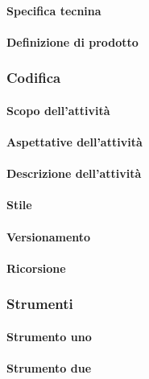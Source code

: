  \paragraph{Specifica tecnina}

 \paragraph{Definizione di prodotto}

\subsubsection{Codifica}
 \paragraph{Scopo dell'attività}

 \paragraph{Aspettative dell'attività}

 \paragraph{Descrizione dell'attività}

 \paragraph{Stile}

 \paragraph{Versionamento}

 \paragraph{Ricorsione}

\subsubsection{Strumenti}
  \paragraph{Strumento uno}

 \paragraph{Strumento due}



  
